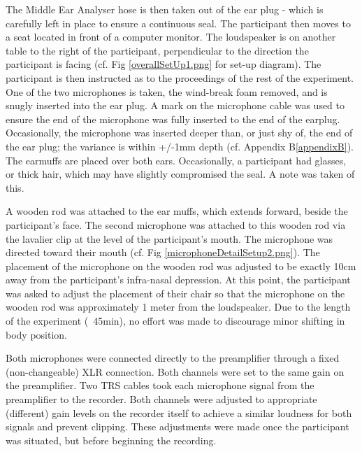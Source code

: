 \documentclass[dissertation,copyright]{uathesis}
\begin{document}
The Middle Ear Analyser hose is then taken out of the ear plug - which is carefully left in place to ensure a continuous seal.  The participant then moves to a seat located in front of a computer monitor.  The loudspeaker is on another table to the right of the participant, perpendicular to the direction the participant is facing (cf. Fig \ref{overallSetUp1.png} for set-up diagram).  The participant is then instructed as to the proceedings of the rest of the experiment. One of the two microphones is taken, the wind-break foam removed, and is snugly inserted into the ear plug.  A mark on the microphone cable was used to ensure the end of the microphone was fully inserted to the end of the earplug.  Occasionally, the microphone was inserted deeper than, or just shy of, the end of the ear plug; the variance is within +/-1mm depth (cf. Appendix B\ref{appendixB}).  The earmuffs are placed over both ears.  Occasionally, a participant had glasses, or thick hair, which may have slightly compromised the seal.  A note was taken of this. 

A wooden rod was attached to the ear muffs, which extends forward, beside the participant's face.  The second microphone was attached to this wooden rod via the lavalier clip at the level of the participant's mouth.  The microphone was directed toward their mouth (cf. Fig \ref{microphoneDetailSetup2.png}).  The placement of the microphone on the wooden rod was adjusted to be exactly 10cm away from the participant's infra-nasal depression.  At this point, the participant was asked to adjust the placement of their chair so that the microphone on the wooden rod was approximately 1 meter from the loudspeaker. Due to the length of the experiment (~45min), no effort was made to discourage minor shifting in body position.  

Both microphones were connected directly to the preamplifier through a fixed (non-changeable) XLR connection.  Both channels were set to the same gain on the preamplifier.  Two TRS cables took each microphone signal from the preamplifier to the recorder.  Both channels were adjusted to appropriate (different) gain levels on the recorder itself to achieve a similar loudness for both signals and prevent clipping.  These adjustments were made once the participant was situated, but before beginning the recording.
\end{document}
